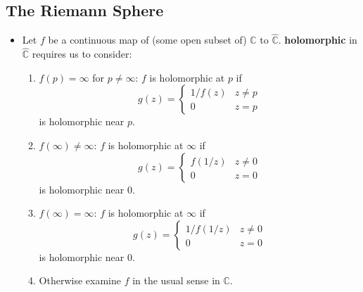 \documentclass{article}
\newenvironment{topic}[1]{%
{\subsection{#1}}%
\begin{itemize}%
}{%
\end{itemize}%
}
\newcommand{\term}[1]{{\bf #1}}
\newcommand{\remark}{\item}
\begin{document}
\begin{topic}{The Riemann Sphere}
\remark Let $f$ be a continuous map of (some open subset of) $\hat{\mathbb{C}}$ to $\hat{\mathbb{C}}$. \term{holomorphic} in $\hat{\mathbb{C}}$ requires us to consider: \begin{enumerate}
\item $f(p) = \infty$ for $p \neq \infty$: $f$ is holomorphic at $p$ if $$g(z) = \begin{cases}
1/f(z)&z \neq p\\[10pt]
0&z = p
\end{cases}$$ is holomorphic near $p$.

\item $f(\infty) \neq \infty$: $f$ is holomorphic at $\infty$ if $$g(z) = \begin{cases}
f(1/z)&z \neq 0\\[10pt]
0&z = 0
\end{cases}$$ is holomorphic near $0$.

\item $f(\infty) = \infty$: $f$ is holomorphic at $\infty$ if $$g(z) = \begin{cases}
1/f(1/z)&z \neq 0\\[10pt]
0&z = 0
\end{cases}$$ is holomorphic near $0$.

\item Otherwise examine $f$ in the usual sense in $\mathbb{C}$.
\end{enumerate}

\end{topic}
\end{document}
